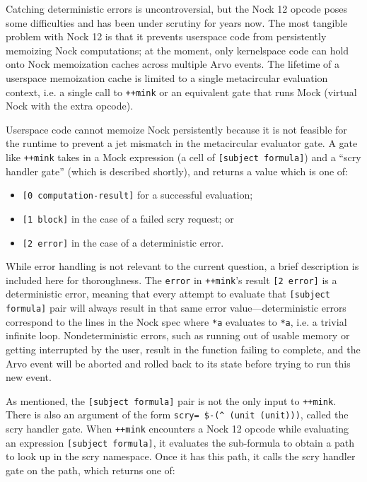 \documentclass[twoside]{article}
\begin{document}
Catching deterministic errors is uncontroversial, but the Nock 12 opcode poses some difficulties and has been under scrutiny for years now.  The most tangible problem with Nock 12 is that it prevents userspace code from persistently memoizing Nock computations; at the moment, only kernelspace code can hold onto Nock memoization caches across multiple Arvo events.  The lifetime of a userspace memoization cache is limited to a single metacircular evaluation context, i.e. a single call to \lstinline[style=inlinecode]{++mink} or an equivalent gate that runs Mock (virtual Nock with the extra opcode).

Userspace code cannot memoize Nock persistently because it is not feasible for the runtime to prevent a jet mismatch in the metacircular evaluator gate.  A gate like \lstinline[style=inlinecode]{++mink} takes in a Mock expression (a cell of \lstinline[style=inlinecode]{[subject formula]}) and a “scry handler gate” (which is described shortly), and returns a value which is one of:

\begin{itemize}
  \item  \lstinline[style=inlinecode]{[0 computation-result]} for a successful evaluation;
  \item  \lstinline[style=inlinecode]{[1 block]} in the case of a failed scry request; or
  \item  \lstinline[style=inlinecode]{[2 error]} in the case of a deterministic error.
\end{itemize}

\noindent
While error handling is not relevant to the current question, a brief description is included here for thoroughness.  The \lstinline[style=inlinecode]{error} in \lstinline[style=inlinecode]{++mink}'s result \lstinline[style=inlinecode]{[2 error]} is a deterministic error, meaning that every attempt to evaluate that \lstinline[style=inlinecode]{[subject formula]} pair will always result in that same error value—deterministic errors correspond to the lines in the Nock spec where \lstinline[style=inlinecode]{*a} evaluates to \lstinline[style=inlinecode]{*a}, i.e. a trivial infinite loop.  Nondeterministic errors, such as running out of usable memory or getting interrupted by the user, result in the function failing to complete, and the Arvo event will be aborted and rolled back to its state before trying to run this new event.

As mentioned, the \lstinline[style=inlinecode]{[subject formula]} pair is not the only input to \lstinline[style=inlinecode]{++mink}.  There is also an argument of the form \lstinline[style=inlinecode]{scry= $-(^ (unit (unit)))}, called the scry handler gate.  When \lstinline[style=inlinecode]{++mink} encounters a Nock 12 opcode while evaluating an expression \lstinline[style=inlinecode]{[subject formula]}, it evaluates the sub-formula to obtain a path to look up in the scry namespace.  Once it has this path, it calls the scry handler gate on the path, which returns one of:
\end{document}
